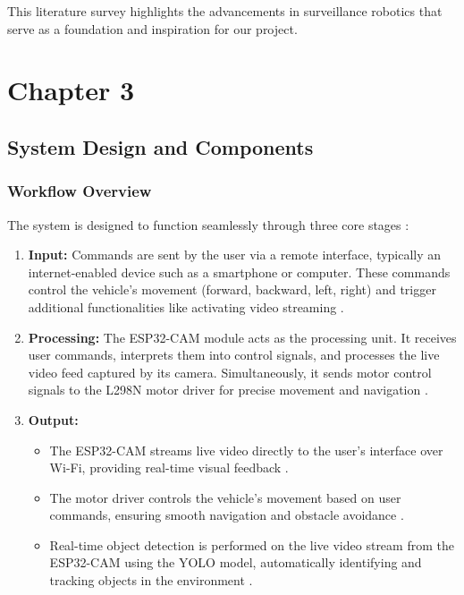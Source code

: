 \documentclass[12pt,a4paper]{report}
\begin{document}
This literature survey highlights the advancements in surveillance robotics that serve as a foundation and inspiration for our project.






	{\vfill \chapter*{\centering \vfill Chapter 3 \vfill}\vfill}
	\thispagestyle{empty}
	\newpage
	\label{System Design and Components}
	\section{System Design and Components}
	\label{Workflow Overview}
	\subsection{Workflow Overview}

The system is designed to function seamlessly through three core stages \cite{esp32cam, circuitdesign, yolov10}:

\begin{enumerate}
    \item \textbf{Input:} Commands are sent by the user via a remote interface, typically an internet-enabled device such as a smartphone or computer. These commands control the vehicle's movement (forward, backward, left, right) and trigger additional functionalities like activating video streaming \cite{iot}.
    
    \item \textbf{Processing:} The ESP32-CAM module acts as the processing unit. It receives user commands, interprets them into control signals, and processes the live video feed captured by its camera. Simultaneously, it sends motor control signals to the L298N motor driver for precise movement and navigation \cite{esp32cam, circuitdesign}.
    
    \item \textbf{Output:} 
    \begin{itemize}
        \item The ESP32-CAM streams live video directly to the user's interface over Wi-Fi, providing real-time visual feedback \cite{esp32cam}.
        \item The motor driver controls the vehicle's movement based on user commands, ensuring smooth navigation and obstacle avoidance \cite{circuitdesign}.
        \item Real-time object detection is performed on the live video stream from the ESP32-CAM using the YOLO model, automatically identifying and tracking objects in the environment \cite{yolov10}.
    \end{itemize}
\end{enumerate}
\end{document}
